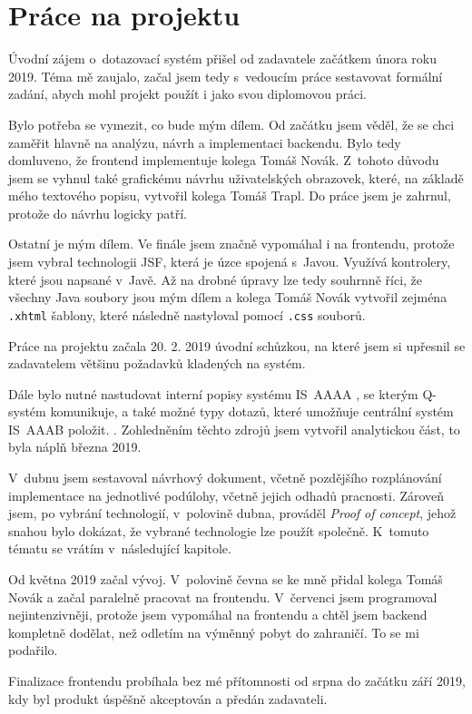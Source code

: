 \documentclass[thesis=M,czech]{FITthesis}[2019/12/23]
\begin{document}
\section{Práce na projektu}
\label{PraceNaProjektu}
Úvodní zájem o~dotazovací systém přišel od zadavatele začátkem února roku 2019. Téma mě zaujalo, začal jsem tedy s~vedoucím práce sestavovat formální zadání, abych mohl projekt použít i jako svou diplomovou práci.

Bylo potřeba se vymezit, co bude mým dílem. Od začátku jsem věděl, že se chci zaměřit hlavně na analýzu, návrh a implementaci backendu. Bylo tedy domluveno, že frontend implementuje kolega Tomáš Novák. 
Z~tohoto důvodu jsem se vyhnul také grafickému návrhu uživatelských obrazovek, které, na základě mého textového popisu, vytvořil kolega Tomáš Trapl. Do práce jsem je zahrnul, protože do návrhu logicky patří.

Ostatní je mým dílem. Ve finále jsem značně vypomáhal i na frontendu, protože jsem vybral technologii JSF, která je úzce spojená s~Javou. Využívá kontrolery, které jsou napsané v~Javě. Až na drobné úpravy lze tedy souhrnně říci, že všechny Java soubory jsou mým dílem a kolega Tomáš Novák vytvořil zejména \texttt{.xhtml} šablony, které následně nastyloval pomocí \texttt{.css} souborů.

Práce na projektu začala 20. 2. 2019 úvodní schůzkou, na které jsem si upřesnil se zadavatelem většinu požadavků kladených na systém. 

Dále bylo nutné nastudovat interní popisy systému IS~AAAA \cite{IsAAA, i1, i2}, se kterým Q-systém komunikuje, a také možné typy dotazů, které umožňuje centrální systém IS~AAAB položit. \cite{Queries, ICT}. Zohledněním těchto zdrojů jsem vytvořil analytickou část, to byla náplň března 2019.

V~dubnu jsem sestavoval návrhový dokument, včetně pozdějšího rozplánování implementace na jednotlivé podúlohy, včetně jejich odhadů pracnosti. Zároveň jsem, po vybrání technologií, v~polovině dubna, prováděl \textit{Proof of concept}, jehož snahou bylo dokázat, že vybrané technologie lze použít společně. K~tomuto tématu se vrátím v~následující kapitole.

Od května 2019 začal vývoj. V~polovině čevna se ke mně přidal kolega Tomáš Novák a začal paralelně pracovat na frontendu. V~červenci jsem programoval nejintenzivněji, protože jsem vypomáhal na frontendu a chtěl jsem backend kompletně dodělat, než odletím na výměnný pobyt do zahraničí. To se mi podařilo.

Finalizace frontendu probíhala bez mé přítomnosti od srpna do začátku září 2019, kdy byl produkt úspěšně akceptován a předán zadavateli. 
\end{document}
